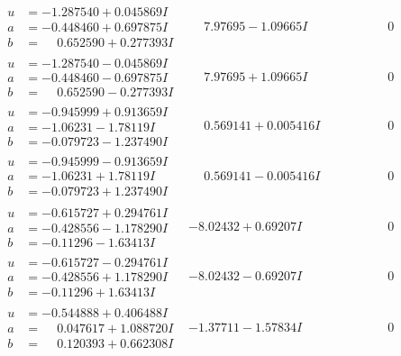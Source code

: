 \documentclass[1p]{elsarticle_modified}
\theoremstyle{definition}
\begin{document}
$$\begin{array}{c|c|c}
\begin{aligned}
u &= -1.287540 + 0.045869 I \\
a &= -0.448460 + 0.697875 I \\
b &= \phantom{-}0.652590 + 0.277393 I\end{aligned}
 & \phantom{-}7.97695 - 1.09665 I & \phantom{-0.000000 } 0 \\ \hline\begin{aligned}
u &= -1.287540 - 0.045869 I \\
a &= -0.448460 - 0.697875 I \\
b &= \phantom{-}0.652590 - 0.277393 I\end{aligned}
 & \phantom{-}7.97695 + 1.09665 I & \phantom{-0.000000 } 0 \\ \hline\begin{aligned}
u &= -0.945999 + 0.913659 I \\
a &= -1.06231 - 1.78119 I \\
b &= -0.079723 - 1.237490 I\end{aligned}
 & \phantom{-}0.569141 + 0.005416 I & \phantom{-0.000000 } 0 \\ \hline\begin{aligned}
u &= -0.945999 - 0.913659 I \\
a &= -1.06231 + 1.78119 I \\
b &= -0.079723 + 1.237490 I\end{aligned}
 & \phantom{-}0.569141 - 0.005416 I & \phantom{-0.000000 } 0 \\ \hline\begin{aligned}
u &= -0.615727 + 0.294761 I \\
a &= -0.428556 - 1.178290 I \\
b &= -0.11296 - 1.63413 I\end{aligned}
 & -8.02432 + 0.69207 I & \phantom{-0.000000 } 0 \\ \hline\begin{aligned}
u &= -0.615727 - 0.294761 I \\
a &= -0.428556 + 1.178290 I \\
b &= -0.11296 + 1.63413 I\end{aligned}
 & -8.02432 - 0.69207 I & \phantom{-0.000000 } 0 \\ \hline\begin{aligned}
u &= -0.544888 + 0.406488 I \\
a &= \phantom{-}0.047617 + 1.088720 I \\
b &= \phantom{-}0.120393 + 0.662308 I\end{aligned}
 & -1.37711 - 1.57834 I & \phantom{-0.000000 } 0 \\ \hline\begin{aligned}

\end{aligned}
\end{array}$$
\end{document}
